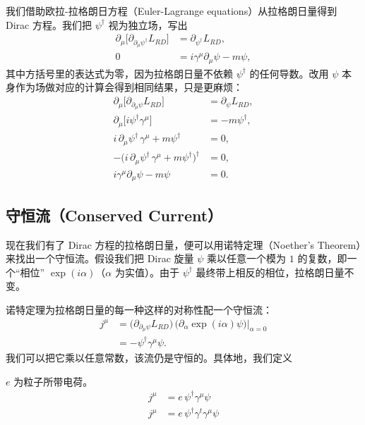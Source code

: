 我们借助欧拉-拉格朗日方程（Euler-Lagrange equations）从拉格朗日量得到 Dirac 方程。我们把 $\psi^{\dagger}$ 视为独立场，写出
\begin{align*}
\partial_{\mu}\bigl[\partial_{\partial_{\mu}\psi^{\dagger}}L_{RD}\bigr] &= \partial_{\psi^{\dagger}}L_{RD},\\
0 &= i\gamma^{\mu}\partial_{\mu}\psi-m\psi,
\end{align*}
其中方括号里的表达式为零，因为拉格朗日量不依赖 $\psi^{\dagger}$ 的任何导数。改用 $\psi$ 本身作为场做对应的计算会得到相同结果，只是更麻烦：
\begin{align*}
\partial_{\mu}\bigl[\partial_{\partial_{\mu}\psi}L_{RD}\bigr] &= \partial_{\psi}L_{RD},\\
\partial_{\mu}\bigl[i\psi^{\dagger}\gamma^{\mu}\bigr] &= -m\psi^{\dagger},\\
i\,\partial_{\mu}\psi^{\dagger}\,\gamma^{\mu}+m\psi^{\dagger} &= 0,\\
-\bigl(i\,\partial_{\mu}\psi^{\dagger}\,\gamma^{\mu}+m\psi^{\dagger}\bigr)^{\dagger} &= 0,\\
i\gamma^{\mu}\partial_{\mu}\psi-m\psi &= 0 .
\end{align*}

\subsection{守恒流（Conserved Current）}

现在我们有了 Dirac 方程的拉格朗日量，便可以用诺特定理（Noether's Theorem）来找出一个守恒流。假设我们把 Dirac 旋量 $\psi$ 乘以任意一个模为 $1$ 的复数，即一个“相位” $\exp(i\alpha)$（$\alpha$ 为实值）。由于 $\psi^{\dagger}$ 最终带上相反的相位，拉格朗日量不变。

诺特定理为拉格朗日量的每一种这样的对称性配一个守恒流：
\begin{align*}
j^{\mu} &= \bigl(\partial_{\partial_{\mu}\psi}L_{RD}\bigr)\,\bigl(\partial_{\alpha}\exp(i\alpha)\psi\bigr)\big|_{\alpha=0}\\
&= -\psi^{\dagger}\gamma^{\mu}\psi .
\end{align*}
我们可以把它乘以任意常数，该流仍是守恒的。具体地，我们定义

\begin{keybox}
$e$ 为粒子所带电荷。
\begin{align}
j^{\mu} &= e\,\psi^{\dagger}\gamma^{\mu}\psi \tag{Riemannian}\\
j^{\mu} &= e\,\psi^{\dagger}\gamma^{t}\gamma^{\mu}\psi \tag{Lorentzian}
\end{align}
\end{keybox}

